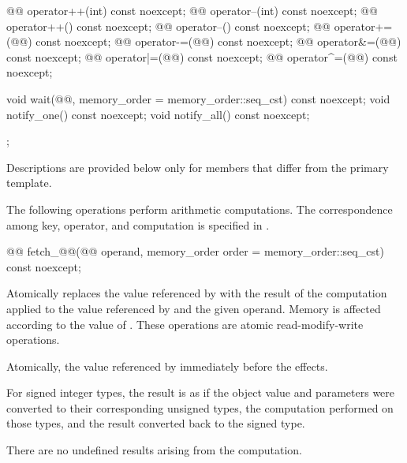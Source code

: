 \begin{codeblock}
{{    @@ operator++(int) const noexcept;
    @@ operator--(int) const noexcept;
    @@ operator++() const noexcept;
    @@ operator--() const noexcept;
    @@ operator+=(@@) const noexcept;
    @@ operator-=(@@) const noexcept;
    @@ operator&=(@@) const noexcept;
    @@ operator|=(@@) const noexcept;
    @@ operator^=(@@) const noexcept;

    void wait(@@, memory_order = memory_order::seq_cst) const noexcept;
    void notify_one() const noexcept;
    void notify_all() const noexcept;
  };
}
\end{codeblock}

\pnum
Descriptions are provided below only for members
that differ from the primary template.

\pnum
The following operations perform arithmetic computations.
The correspondence among key, operator, and computation is specified
in .

%
%
%
%
%
\begin{itemdecl}
@@ fetch_@@(@@ operand,
  memory_order order = memory_order::seq_cst) const noexcept;
\end{itemdecl}

\begin{itemdescr}
\pnum
\effects
Atomically replaces the value referenced by  with
the result of the computation applied to the value referenced by 
and the given operand.
Memory is affected according to the value of .
These operations are atomic read-modify-write operations.

\pnum
\returns
Atomically, the value referenced by 
immediately before the effects.

\pnum
{}%
\remarks
For signed integer types,
the result is as if the object value and parameters
were converted to their corresponding unsigned types,
the computation performed on those types, and
the result converted back to the signed type.
\begin{note}
There are no undefined results arising from the computation.
\end{note}
\end{itemdescr}

